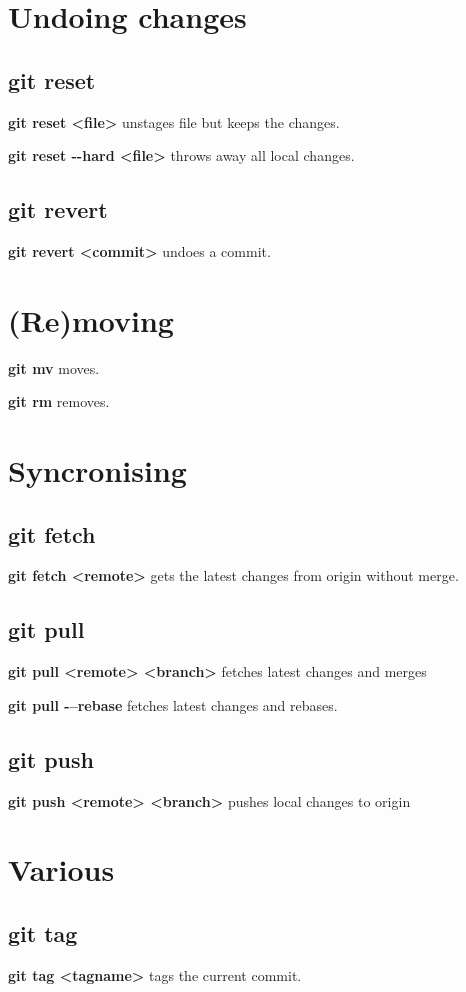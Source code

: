 \documentclass[a4paper, twoside, 8pt]{extarticle}
\begin{document}
\begin{multicols*}{3}
\section*{Undoing changes} %
\subsection*{\dotfill git reset}
\textbf{git reset <file>} unstages file but keeps the changes.

\textbf{git reset -{}-hard <file>} throws away all local changes.

\subsection*{\dotfill git revert}
\textbf{git revert <commit>} undoes a commit.

\section*{(Re)moving} %
\textbf{git mv} moves.

\textbf{git rm} removes.

\section*{Syncronising} %

\subsection*{\dotfill git fetch}
\textbf{git fetch <remote>} gets the latest changes from origin without merge.

\subsection*{\dotfill git pull}
\textbf{git pull <remote> <branch>} fetches latest changes and merges

\textbf{git pull -{}--rebase} fetches latest changes and rebases.

\subsection*{\dotfill git push}
\textbf{git push <remote> <branch>} pushes local changes to origin

\section*{Various}
\subsection*{\dotfill git tag}
\textbf{git tag <tagname>} tags the current commit.
\end{multicols*}
\end{document}
